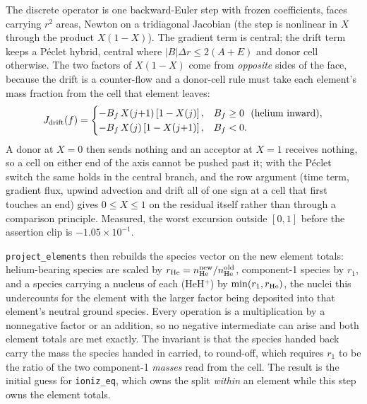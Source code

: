 The discrete operator is one backward-Euler step with frozen coefficients,
faces carrying $r^{2}$ areas, Newton on a tridiagonal Jacobian (the step is
nonlinear in $X$ through the product $X(1-X)$). The gradient term is central;
the drift term keeps a P\'eclet hybrid, central where
$|B|\Delta r \le 2(A+E)$ and donor cell otherwise. The two factors of
$X(1-X)$ come from \emph{opposite} sides of the face, because the drift is a
counter-flow and a donor-cell rule must take each element's mass fraction
from the cell that element leaves:
\begin{equation}
J_{\rm drift}(f) =
\begin{cases}
 -B_f\,X(j{+}1)\left[1-X(j)\right], & B_f\ge0\ \ (\text{helium inward}),\\
 -B_f\,X(j)\left[1-X(j{+}1)\right], & B_f<0.
\end{cases}
\label{eq:mol:driftface}
\end{equation}
A donor at $X=0$ then sends nothing and an acceptor at $X=1$ receives
nothing, so a cell on either end of the axis cannot be pushed past it; with
the P\'eclet switch the same holds in the central branch, and the row
argument (time term, gradient flux, upwind advection and drift all of one
sign at a cell that first touches an end) gives $0\le X\le1$ on the residual
itself rather than through a comparison principle. Measured, the worst excursion outside $[0,1]$ before the assertion clip is
$-1.05\times10^{-1}$.

\texttt{project\_elements} then rebuilds the species vector on the new
element totals: helium-bearing species are scaled by
$r_{\rm He}=n_{\rm He}^{\rm new}/n_{\rm He}^{\rm old}$, component-1 species
by $r_1$, and a species carrying a nucleus of each (HeH$^+$) by
$\min(r_1,r_{\rm He})$, the nuclei this undercounts for the element with the
larger factor being deposited into that element's neutral ground species.
Every operation is a multiplication by a nonnegative factor or an addition,
so no negative intermediate can arise and both element totals are met
exactly. The invariant is that the species handed back carry the mass the
species handed in carried, to round-off, which requires $r_1$ to be the ratio
of the two component-1 \emph{masses} read from the cell. The result is the
initial guess for \texttt{ioniz\_eq}, which owns the split \emph{within} an
element while this step owns the element totals.

